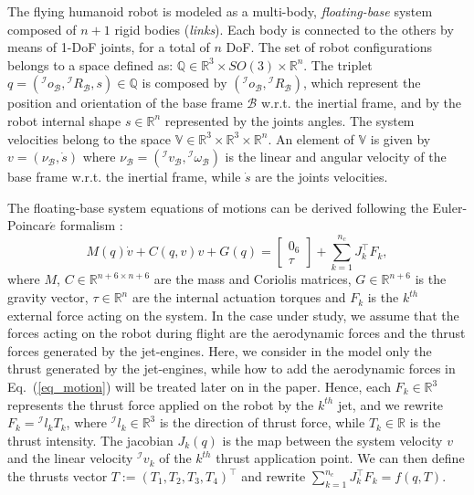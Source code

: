 The flying humanoid robot is modeled as a multi-body, \emph{floating-base} system composed of $n+1$ rigid bodies (\emph{links}). Each body is connected to the others by means of 1-DoF joints, for a total of $n$ DoF. The set of robot configurations belongs to a space defined as: $\mathbb{Q} \in \mathbb{R}^3 \times SO(3) \times \mathbb{R}^n$. The triplet $q=( {} ^{\mathcal{I}}o_{\mathcal{B}} , {} ^{\mathcal{I}}R_{\mathcal{B}} , s) \in \mathbb{Q}$ is composed by $( {} ^{\mathcal{I}}o_{\mathcal{B}} , {} ^{\mathcal{I}}R_{\mathcal{B}})$, which represent the position and orientation of the base frame $\mathcal{B}$ w.r.t. the inertial frame, and by the robot internal shape $s \in \mathbb{R}^n$ represented by the joints angles. The system velocities belong to the space $\mathbb{V} \in \mathbb{R}^3 \times \mathbb{R}^3 \times \mathbb{R}^n$. An element of $\mathbb{V}$ is given by $v=(\nu_{\mathcal{B}},\dot{s})$ where $\nu_{\mathcal{B}}=({}^{\mathcal{I}} v_{\mathcal{B}},{}^{\mathcal{I}} \omega_{\mathcal{B}})$ is the linear and angular velocity of the base frame w.r.t. the inertial frame, while $\dot{s}$ are the joints velocities.

The floating-base system equations of motions can be derived following the Euler-Poincar$\acute{e}$ formalism \cite{c4}:
\begin{equation}
\label{eq_motion}
M(q)\dot{v}+C(q,v)v+G(q)=
\begin{bmatrix}
0_6\\
\tau
\end{bmatrix}
+\sum_{k=1}^{n_c}J_k^{\top} F_k ,
\end{equation}
where $M$, $C \in \mathbb{R}^{n+6\times n+6}$ are the mass and Coriolis matrices, $G \in \mathbb{R}^{n+6}$ is the gravity vector, $\tau \in \mathbb{R}^n$ are the internal actuation torques and $F_k$ is the $k^{th}$ external force acting on the system. In the case under study, we assume that the forces acting on the robot during flight are the aerodynamic forces and the thrust forces generated by the jet-engines. Here, we consider in the model only the thrust generated by the jet-engines, while how to add the aerodynamic forces in Eq.~(\ref{eq_motion}) will be treated later on in the paper. Hence, each $F_k \in \mathbb{R}^3$ represents the thrust force applied on the robot by the $k^{th}$ jet, and we rewrite $F_k={}^\mathcal{I}l_k T_k$, where ${}^\mathcal{I}l_k \in \mathbb{R}^3$ is the direction of thrust force, while $T_k \in \mathbb{R}$ is the thrust intensity. The jacobian $J_k(q)$ is the map between the system velocity $v$ and the linear velocity ${}^\mathcal{I} v_k$ of the $k^{th}$ thrust application point. We can then define the thrusts vector $T:=(T_1, T_2, T_3, T_4)^{\top}$ and rewrite $\sum^{n_c}_{k=1}J_k^{\top}F_k = f(q,T)$.

